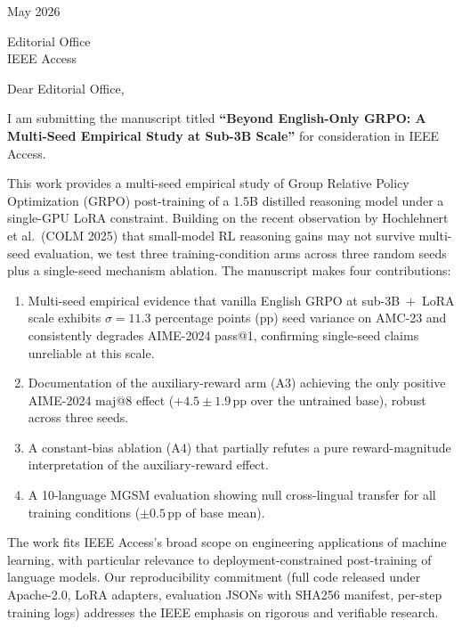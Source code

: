 \documentclass[11pt]{article}
\begin{document}
 May 2026

\bigskip

\noindent Editorial Office \\
IEEE Access

\vspace{1.5em}

\noindent Dear Editorial Office,

\medskip

I am submitting the manuscript titled \textbf{``Beyond English-Only GRPO:
A Multi-Seed Empirical Study at Sub-3B Scale''} for consideration in
IEEE Access.

This work provides a multi-seed empirical study of Group Relative Policy
Optimization (GRPO) post-training of a 1.5B distilled reasoning model under
a single-GPU LoRA constraint. Building on the recent observation by
Hochlehnert et al.~(COLM 2025) that small-model RL reasoning gains may not
survive multi-seed evaluation, we test three training-condition arms across
three random seeds plus a single-seed mechanism ablation. The manuscript
makes four contributions:

\begin{enumerate}
\item Multi-seed empirical evidence that vanilla English GRPO at
sub-3B~$+$~LoRA scale exhibits $\sigma = 11.3$ percentage points (pp) seed
variance on AMC-23 and consistently degrades AIME-2024 pass@1, confirming
single-seed claims unreliable at this scale.

\item Documentation of the auxiliary-reward arm (A3) achieving the only
positive AIME-2024 maj@8 effect ($+4.5 \pm 1.9$\,pp over the untrained
base), robust across three seeds.

\item A constant-bias ablation (A4) that partially refutes a pure
reward-magnitude interpretation of the auxiliary-reward effect.

\item A 10-language MGSM evaluation showing null cross-lingual transfer
for all training conditions ($\pm 0.5$\,pp of base mean).
\end{enumerate}

The work fits IEEE Access's broad scope on engineering applications of
machine learning, with particular relevance to deployment-constrained
post-training of language models. Our reproducibility commitment (full
code released under Apache-2.0, LoRA adapters, evaluation JSONs with
SHA256 manifest, per-step training logs) addresses the IEEE emphasis on
rigorous and verifiable research.
\end{document}
